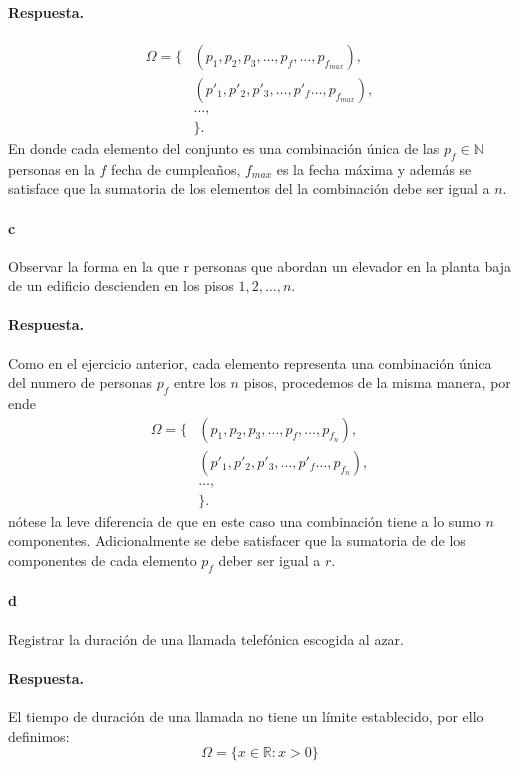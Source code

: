 \documentclass{article}
\begin{document}
\paragraph{Respuesta.}
\begin{align*}
    \Omega = \{ &(p_1, p_2, p_3, \dots, p_{f}, \dots, p_{f_{max}}),\\
                &(p'_1, p'_2, p'_3, \dots, p'_{f} \dots, p_{f_{max}}),\\
                &\dots,\\
              &\}.
\end{align*}
En donde cada elemento del conjunto es una combinación única de las $p_f \in \mathbb{N}$ personas en la $f$ fecha de cumpleaños, $f_{max}$ es la fecha máxima y además se satisface que la sumatoria de los elementos del la combinación debe ser igual a $n$.
\paragraph{c} Observar la forma en la que r personas que abordan un elevador en la planta baja de un edificio descienden en los pisos $1, 2, \dots, n$.
\paragraph{Respuesta.} Como en el ejercicio anterior, cada elemento representa una combinación única del numero de personas $p_f$ entre los $n$ pisos, procedemos de la misma manera, por ende
\begin{align*}
    \Omega = \{ &(p_1, p_2, p_3, \dots, p_{f}, \dots, p_{f_n}),\\
                &(p'_1, p'_2, p'_3, \dots, p'_{f} \dots, p_{f_n}),\\
                &\dots,\\
              &\}.
\end{align*}
nótese la leve diferencia de que en este caso una combinación tiene a lo sumo $n$ componentes. Adicionalmente se debe satisfacer que la sumatoria de de los componentes de cada elemento $p_f$ deber ser igual a $r$.
\paragraph{d} Registrar la duración de una llamada telefónica escogida al azar.
\paragraph{Respuesta.} El tiempo de duración de una llamada no tiene un límite establecido, por ello definimos:
$$\Omega = \{ x \in \mathbb{R} : x > 0 \}$$
\end{document}
